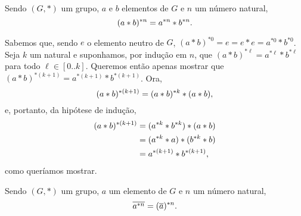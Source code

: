\begin{Propr}\label{abpotn-apotnbpotn}
  Sendo $(G,\ast)$ um grupo, $a$ e $b$ elementos de $G$ e
  $n$ um  número natural,
  \begin{equation*}
    (a\ast b)^{\ast n} = a^{\ast n}\ast b^{\ast n}\mathrm{.}
  \end{equation*}
\end{Propr}

\begin{dem}
  Sabemos que, sendo $e$ o elemento neutro de $G$, $(a\ast b)^{\ast 0} =
  e = e\ast e = a^{\ast 0}\ast b^{\ast 0}$. Seja $k$ um natural e
  suponhamos, por indução em $n$, que $(a\ast b)^{\ast \ell} = a^{\ast
  \ell}\ast b^{\ast \ell}$ para todo $\ell\in[0..k]$. Queremos então
  apenas mostrar que $(a\ast b)^{\ast (k+1)} = a^{\ast
    (k+1)}\ast b^{\ast (k+1)}$. Ora,
  \begin{equation*}
      (a\ast b)^{\ast (k+1)} = (a\ast b)^{\ast k}\ast (a\ast b)\mathrm{,}
  \end{equation*}
  e, portanto, da hipótese de indução,
  \begin{equation*}
    \begin{aligned}
      (a\ast b)^{\ast (k+1)}
        &= (a^{\ast k}\ast b^{\ast k})\ast(a\ast b) \\
        &= (a^{\ast k}\ast a)\ast(b^{\ast k}\ast b) \\
        &= a^{\ast (k+1)}\ast b^{\ast (k+1)}\mathrm{,}
    \end{aligned}
  \end{equation*}
  como queríamos mostrar.
\end{dem}

\begin{Propr}\label{proproveranoveran}
  Sendo $(G,\ast)$ um grupo, $a$ um elemento de $G$ e
  $n$ um número natural,
  \begin{equation*}
    \overline{a^{\ast n}} = (\overline{a})^{\ast n}\mathrm{.}
  \end{equation*}
\end{Propr}

